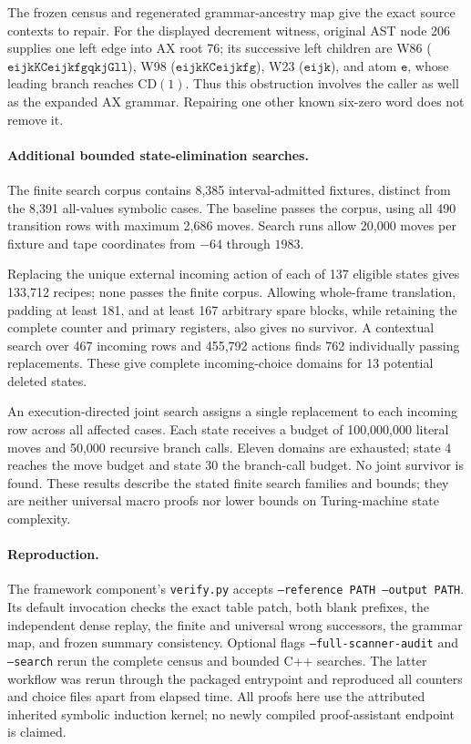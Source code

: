 The frozen census and regenerated grammar-ancestry map give the exact
source contexts to repair.  For the displayed decrement witness, original
AST node 206 supplies one left edge into AX root 76; its successive left
children are W86 ($\texttt{eijkKCeijkfgqkjGll}$), W98
($\texttt{eijkKCeijkfg}$), W23 ($\texttt{eijk}$), and atom
$\texttt{e}$, whose leading branch reaches $\mathrm{CD}(1)$.
Thus this obstruction involves the caller as well as the expanded AX
grammar.  Repairing one other known six-zero word does not remove it.

\paragraph{Additional bounded state-elimination searches.}
The finite search corpus contains 8,385 interval-admitted fixtures,
distinct from the 8,391 all-values symbolic cases.  The baseline passes
the corpus, using all 490 transition rows with maximum 2,686 moves.
Search runs allow 20,000 moves per fixture and tape coordinates from
$-64$ through $1983$.

Replacing the unique external incoming action of each of 137 eligible
states gives 133,712 recipes; none passes the finite corpus.  Allowing
whole-frame translation, padding at least 181, and at least 167 arbitrary
spare blocks, while retaining the complete counter and primary registers,
also gives no survivor.  A contextual search over 467 incoming rows and
455,792 actions finds 762 individually passing replacements.  These give
complete incoming-choice domains for 13 potential deleted states.

An execution-directed joint search assigns a single replacement to each
incoming row across all affected cases.  Each state receives a budget of
100,000,000 literal moves and 50,000 recursive branch calls.  Eleven
domains are exhausted; state 4 reaches the move budget and state 30 the
branch-call budget.  No joint survivor is found.  These results describe
the stated finite search families and bounds; they are neither universal
macro proofs nor lower bounds on Turing-machine state complexity.

\paragraph{Reproduction.}
The framework component's \texttt{verify.py} accepts
\texttt{--reference PATH --output PATH}.  Its default invocation checks
the exact table patch, both blank prefixes, the independent dense replay,
the finite and universal wrong successors, the grammar map, and frozen
summary consistency.  Optional flags \texttt{--full-scanner-audit} and
\texttt{--search} rerun the complete census and bounded C++ searches.
The latter workflow was rerun through the packaged entrypoint and
reproduced all counters and choice files apart from elapsed time.
All proofs here use the attributed inherited symbolic induction kernel;
no newly compiled proof-assistant endpoint is claimed.
